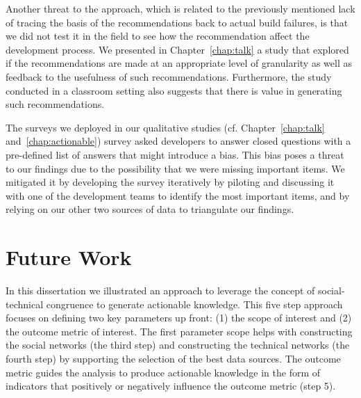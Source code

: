 
Another threat to the approach, which is related to the previously mentioned lack of tracing the basis of the recommendations back to actual build failures, is that we did not test it in the field to see how the recommendation affect the development process.
We presented in Chapter~\ref{chap:talk} a study that explored if the recommendations are made at an appropriate level of granularity as well as feedback to the usefulness of such recommendations.
Furthermore, the study conducted in a classroom setting also suggests that there is value in generating such recommendations.

The surveys we deployed in our qualitative studies (cf. Chapter~\ref{chap:talk} and~\ref{chap:actionable}) survey asked developers to answer closed questions with a pre-defined list of answers that might introduce a bias.
This bias poses a threat to our findings due to the possibility that we were missing important items.
We mitigated it by developing the survey iteratively by piloting and discussing it with one of the development teams to identify the most important items, and by relying on our other two sources of data to triangulate our findings.











\section{Future Work}
\label{ch:dis:con}
In this dissertation we illustrated an approach to leverage the concept of social-technical congruence to generate actionable knowledge.
This five step approach focuses on defining two key parameters up front: (1) the scope of interest and (2) the outcome metric of interest.
The first parameter scope helps with constructing the social networks (the third step) and constructing the technical networks (the fourth step) by supporting the selection of the best data sources.
The outcome metric guides the analysis to produce actionable knowledge in the form of indicators that positively or negatively influence the outcome metric (step 5). 

